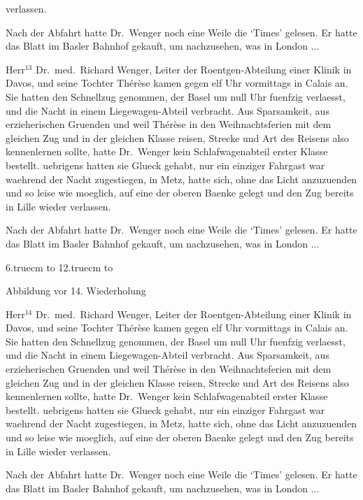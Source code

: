 verlassen.\par
Nach der Abfahrt hatte Dr.~Wen\-ger noch eine
Weile die `Times' gelesen. Er hatte das Blatt im
Basler Bahnhof gekauft, um nachzusehen, was in London ...\par
Herr$^{13}$ Dr.~med.~Richard Wenger, Leiter der Roent\-gen-Ab\-tei\-lung
einer Klinik in Davos, und seine
Tochter Th\'e\-r\`ese kamen gegen elf Uhr vormittags
in Calais an. Sie hatten den Schnellzug genommen,
der Basel um null Uhr fuenfzig verlaesst, und die
Nacht in einem Liege\-wagen-Abteil verbracht.
Aus Sparsamkeit, aus erzieherischen
Gruenden und weil
Th\'e\-r\`ese in den Weihnachtsferien mit dem gleichen
Zug und in der gleichen Klasse reisen, Strecke und
Art des Reisens also kennenlernen sollte, hatte Dr.~Wenger
kein Schlafwagenabteil erster Klasse bestellt.
uebrigens hatten sie Glueck gehabt, nur ein
einziger Fahrgast war waehrend der Nacht zugestiegen,
in Metz, hatte sich, ohne das Licht anzuzuenden
und so leise wie moeglich, auf eine der oberen
Baenke gelegt und den Zug bereits in Lille wieder
verlassen.\par
Nach der Abfahrt hatte Dr.~Wen\-ger noch eine
Weile die `Times' gelesen. Er hatte das Blatt im
Basler Bahnhof gekauft, um nachzusehen, was in London ...\par
\begin{floatingfigure}{6.truecm}%
\vbox to 12.truecm%
{\vfil\hbox to \vfil}%
\caption{Abbildung vor 14. Wiederholung}
\end{floatingfigure}
Herr$^{14}$ Dr.~med.~Richard Wenger, Leiter der Roent\-gen-Ab\-tei\-lung
einer Klinik in Davos, und seine
Tochter Th\'e\-r\`ese kamen gegen elf Uhr vormittags
in Calais an. Sie hatten den Schnellzug genommen,
der Basel um null Uhr fuenfzig verlaesst, und die
Nacht in einem Liege\-wagen-Abteil verbracht.
Aus Sparsamkeit, aus erzieherischen
Gruenden und weil
Th\'e\-r\`ese in den Weihnachtsferien mit dem gleichen
Zug und in der gleichen Klasse reisen, Strecke und
Art des Reisens also kennenlernen sollte, hatte Dr.~Wenger
kein Schlafwagenabteil erster Klasse bestellt.
uebrigens hatten sie Glueck gehabt, nur ein
einziger Fahrgast war waehrend der Nacht zugestiegen,
in Metz, hatte sich, ohne das Licht anzuzuenden
und so leise wie moeglich, auf eine der oberen
Baenke gelegt und den Zug bereits in Lille wieder
verlassen.\par
Nach der Abfahrt hatte Dr.~Wen\-ger noch eine
Weile die `Times' gelesen. Er hatte das Blatt im
Basler Bahnhof gekauft, um nachzusehen, was in London ...\par
